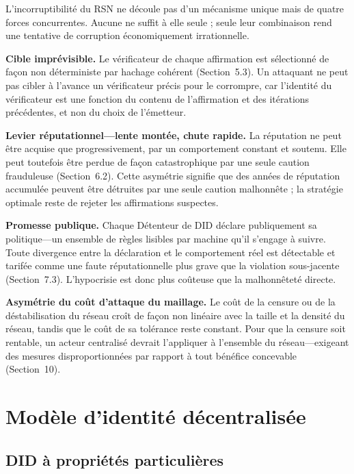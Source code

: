 \documentclass[11pt,a4paper,twocolumn]{article}
\begin{document}
L'incorruptibilité du RSN ne découle pas d'un mécanisme unique mais de quatre forces concurrentes. Aucune ne suffit à elle seule ; seule leur combinaison rend une tentative de corruption économiquement irrationnelle.

\textbf{Cible imprévisible.} Le vérificateur de chaque affirmation est sélectionné de façon non déterministe par hachage cohérent (Section~5.3). Un attaquant ne peut pas cibler à l'avance un vérificateur précis pour le corrompre, car l'identité du vérificateur est une fonction du contenu de l'affirmation et des itérations précédentes, et non du choix de l'émetteur.

\textbf{Levier réputationnel---lente montée, chute rapide.} La réputation ne peut être acquise que progressivement, par un comportement constant et soutenu. Elle peut toutefois être perdue de façon catastrophique par une seule caution frauduleuse (Section~6.2). Cette asymétrie signifie que des années de réputation accumulée peuvent être détruites par une seule caution malhonnête ; la stratégie optimale reste de rejeter les affirmations suspectes.

\textbf{Promesse publique.} Chaque Détenteur de DID déclare publiquement sa politique---un ensemble de règles lisibles par machine qu'il s'engage à suivre. Toute divergence entre la déclaration et le comportement réel est détectable et tarifée comme une faute réputationnelle plus grave que la violation sous-jacente (Section~7.3). L'hypocrisie est donc plus coûteuse que la malhonnêteté directe.

\textbf{Asymétrie du coût d'attaque du maillage.} Le coût de la censure ou de la déstabilisation du réseau croît de façon non linéaire avec la taille et la densité du réseau, tandis que le coût de sa tolérance reste constant. Pour que la censure soit rentable, un acteur centralisé devrait l'appliquer à l'ensemble du réseau---exigeant des mesures disproportionnées par rapport à tout bénéfice concevable (Section~10).

\section{Modèle d'identité décentralisée}

\subsection{DID à propriétés particulières}
\end{document}
